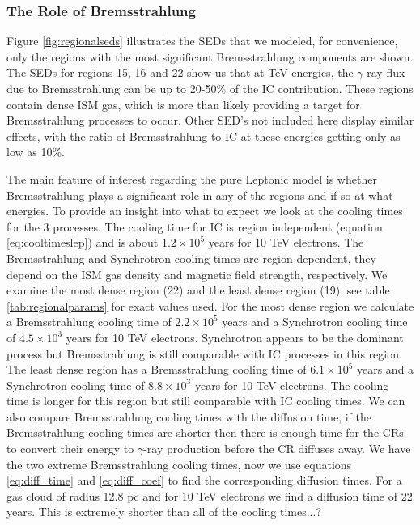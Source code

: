 \documentclass[12pt,a4paper]{article}
\begin{document}
\subsubsection{The Role of Bremsstrahlung}
Figure \ref{fig:regionalseds} illustrates the SEDs that we modeled, for convenience, only the regions with the most significant Bremsstrahlung components are shown. The SEDs for regions 15, 16 and 22 show us that at TeV energies, the $\gamma$-ray flux due to Bremsstrahlung can be up to 20-50\% of the IC contribution. These regions contain dense ISM gas, which is more than likely providing a target for Bremsstrahlung processes to occur. Other SED's not included here display similar effects, with the ratio of Bremsstrahlung to IC at these energies getting only as low as 10\%.

The main feature of interest regarding the pure Leptonic model is whether Bremsstrahlung plays a significant role in any of the regions and if so at what energies. To provide an insight into what to expect we look at the cooling times for the 3 processes. The cooling time for IC is region independent (equation \ref{eq:cooltimeslep}) and is about $1.2 \times 10^5$ years for 10 TeV electrons. The Bremsstrahlung and Synchrotron cooling times are region dependent, they depend on the ISM gas density and magnetic field strength, respectively. We examine the most dense region (22) and the least dense region (19), see table \ref{tab:regionalparams} for exact values used. For the most dense region we calculate a Bremsstrahlung cooling time of $2.2 \times 10^5$ years and a Synchrotron cooling time of $4.5 \times 10^3$ years for 10 TeV electrons. Synchrotron appears to be the dominant process but Bremsstrahlung is still comparable with IC processes in this region. The least dense region has a Bremsstrahlung cooling time of $6.1 \times 10^5$ years and a Synchrotron cooling time of $8.8 \times 10^3$ years for 10 TeV electrons. The cooling time is longer for this region but still comparable with IC cooling times. We can also compare Bremsstrahlung cooling times with the diffusion time, if the Bremsstrahlung cooling times are shorter then there is enough time for the CRs to convert their energy to $\gamma$-ray production before the CR diffuses away. We have the two extreme Bremsstrahlung cooling times, now we use equations \ref{eq:diff_time} and \ref{eq:diff_coef} to find the corresponding diffusion times. For a gas cloud of radius 12.8 pc and for 10 TeV electrons we find a diffusion time of 22 years. This is extremely shorter than all of the cooling times...? 
\end{document}
